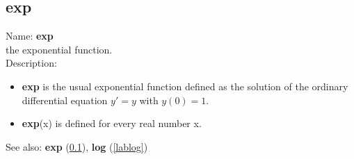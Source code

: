 \subsection{exp}
\label{labexp}
\noindent Name: \textbf{exp}\\
the exponential function.\\

\noindent Description: \begin{itemize}

\item \textbf{exp} is the usual exponential function defined as the solution of the
   ordinary differential equation $y'=y$ with $y(0)=1$.

\item \textbf{exp}(x) is defined for every real number x.
\end{itemize}
See also: \textbf{exp} (\ref{labexp}), \textbf{log} (\ref{lablog})
